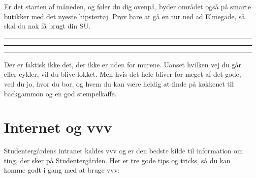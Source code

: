 \documentclass[11pt,article,twoside,openany,danish,extrafontsizes]{memoir} %
\begin{document}
Er det starten af måneden, og føler du dig ovenpå, byder området også på smarte butikker med det nyeste hipstertøj. Prøv bare at gå en tur ned ad Elmegade, så skal du nok få brugt din SU.

\plainbreak{0.5}
\fancybreak{$* \qquad * \qquad *$}
\plainbreak{0.5}

Der er faktisk ikke det, der ikke er uden for murene. Uanset hvilken vej du går eller cykler, vil du blive lokket. Men hvis det hele bliver for meget af det gode, ved du jo, hvor du bor, og hvem du kan være heldig at finde på køkkenet til backgammon og en god stempelkaffe.



\clearpage


\chapter{Internet og vvv}
\label{chap:vvv}
Studentergårdens intranet kaldes vvv og er den bedste kilde til information om ting, der sker på Studentergården. Her er tre gode tips og tricks, så du kan komme godt i gang med at bruge vvv:
\end{document}
